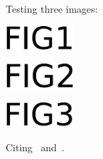 \documentclass[leqno]{amsart}
\begin{document}
Testing three images:

\begin{center}
  \includegraphics[width=1in]{fig1.pdf}
\end{center}

\begin{center}
  \includegraphics[width=1in]{fig2}
\end{center}

\begin{center}
  \includegraphics[width=1in]{./figs3/fig3}
\end{center}



Citing~\cite{entry1} and~\cite{entry2}.



\end{document}
